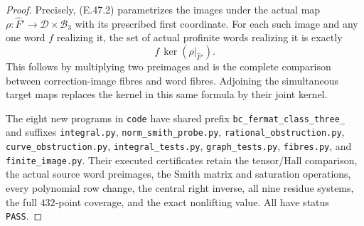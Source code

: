 \begin{proof}
Precisely, \textup{(E.47.2)} parametrizes the
images under the actual map
$\rho:\widehat F'\to\mathscr D\times\mathcal B_3$
with its prescribed first coordinate.
For each such image and any one word $f$
realizing it, the set of actual profinite
words realizing it is exactly
\[
                    f\,\ker(\rho|_{\widehat F'}).
 \tag{E.47.26}
\]
This follows by multiplying two preimages
and is the complete comparison between
correction-image fibres and word fibres.
Adjoining the simultaneous target maps
replaces the kernel in this same formula
by their joint kernel.

The eight new programs in \texttt{code} have
shared prefix \texttt{bc\_fermat\_class\_three\_}
and suffixes \texttt{integral.py},
\texttt{norm\_smith\_probe.py},
\texttt{rational\_obstruction.py},
\texttt{curve\_obstruction.py},
\texttt{integral\_tests.py},
\texttt{graph\_tests.py}, \texttt{fibres.py}, and
\texttt{finite\_image.py}.  Their executed
certificates retain the tensor/Hall comparison,
the actual source word preimages, the Smith
matrix and saturation operations, every
polynomial row change, the central right
inverse, all nine residue systems, the full
$432$-point coverage, and the exact nonlifting
value.  All have status \texttt{PASS}.
\end{proof}
